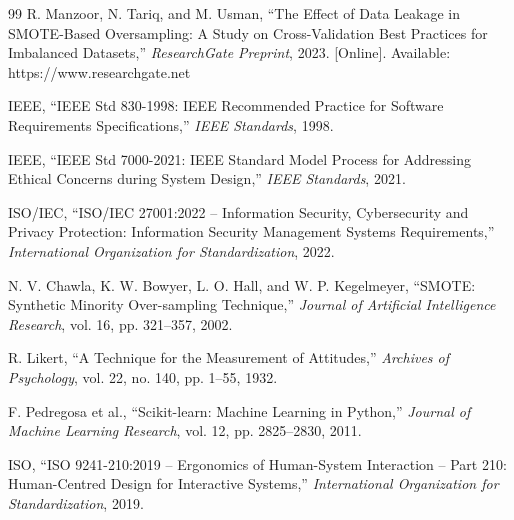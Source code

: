 \documentclass[a4paper,11pt]{report}
\begin{document}
\begin{thebibliography}{99}
 R. Manzoor, N. Tariq, and M. Usman, ``The Effect of Data Leakage in SMOTE-Based Oversampling: A Study on Cross-Validation Best Practices for Imbalanced Datasets,'' \emph{ResearchGate Preprint}, 2023. [Online]. Available: https://www.researchgate.net

 IEEE, ``IEEE Std 830-1998: IEEE Recommended Practice for Software Requirements Specifications,'' \emph{IEEE Standards}, 1998.

 IEEE, ``IEEE Std 7000-2021: IEEE Standard Model Process for Addressing Ethical Concerns during System Design,'' \emph{IEEE Standards}, 2021.

 ISO/IEC, ``ISO/IEC 27001:2022 -- Information Security, Cybersecurity and Privacy Protection: Information Security Management Systems Requirements,'' \emph{International Organization for Standardization}, 2022.

 N. V. Chawla, K. W. Bowyer, L. O. Hall, and W. P. Kegelmeyer, ``SMOTE: Synthetic Minority Over-sampling Technique,'' \emph{Journal of Artificial Intelligence Research}, vol. 16, pp. 321--357, 2002.

 R. Likert, ``A Technique for the Measurement of Attitudes,'' \emph{Archives of Psychology}, vol. 22, no. 140, pp. 1--55, 1932.

 F. Pedregosa et al., ``Scikit-learn: Machine Learning in Python,'' \emph{Journal of Machine Learning Research}, vol. 12, pp. 2825--2830, 2011.

 ISO, ``ISO 9241-210:2019 -- Ergonomics of Human-System Interaction -- Part 210: Human-Centred Design for Interactive Systems,'' \emph{International Organization for Standardization}, 2019.

\end{thebibliography}

\printindex
\end{document}
